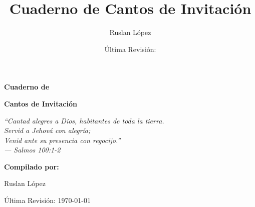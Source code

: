 \documentclass[12pt, spanish]{book}
\title{Cuaderno de Cantos de Invitaci\'on}
\author{Ruslan L\'opez}
\date{\'Ultima Revisi\'on:  \RevDate}
\newcommand{\RevDate}{\today}
\begin{document}
    \hypersetup{pageanchor=false}

    \begin{titlepage}
        \centering

        \vspace*{1cm}

        {\Huge\bfseries\sffamily{$\dagger$}\par}

        \vspace{1.5cm}

        {\Huge\bfseries\sffamily Cuaderno de\par}
        \vspace{0.5cm}
        {\Huge\bfseries\sffamily Cantos de Invitaci\'on\par}

        \vspace{2cm}

        \begin{center}
            \Large\itshape ``Cantad alegres a Dios, habitantes de toda la tierra.\\
            Servid a Jehov\'a con alegr\'ia;\\
            Venid ante su presencia con regocijo.''\\
            \vspace{0.3cm}
            --- Salmos 100:1-2
        \end{center}

        \vspace{2cm}

        {\Large\bfseries Compilado por:\par}
        \vspace{0.5cm}
        {\Large Ruslan L\'opez\par}

        \vfill

        {\large \'Ultima Revisi\'on: \RevDate\par}

        \vspace{1cm}

    \end{titlepage}

    \hypersetup{pageanchor=true}
    \ifWordBk
    \twocolumn
    \fi
\end{document}
